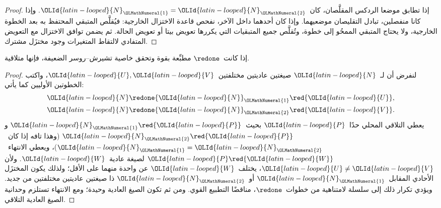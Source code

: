 \documentclass[../../../include/open-logic-section]{subfiles}
\begin{document}
\begin{proof}
  إذا تطابق موضعا الردكس المقلَّصان، كان~${\OLId{latin-looped}{N}}_{\OLMathNumeral{1}}={\OLId{latin-looped}{N}}_{\OLMathNumeral{2}}$. وإذا كانا منفصلين،
  تبادل التقليصان موضعيهما. وإذا كان أحدهما داخل الآخر، نفحص قاعدة الاختزال
  الخارجية: فيُقلَّص المتبقي المحتفظ به بعد الخطوة الخارجية، ولا يحتاج
  المتبقي الممحُو إلى خطوة، وتُقلَّص جميع المتبقيات التي يكررها تعويض بيتا أو
  تعويض الحالة. ثم يضمن توافق الاختزال مع التعويض المتفادي لالتقاط المتغيرات
  وجود مختزَل مشترك.
\end{proof}

\begin{lem}
إذا كانت~$\redone$ مطبِّعة بقوة وتحقق خاصية تشيرش--روسر الضعيفة، فإنها
متلاقية.
\end{lem}

\begin{proof}
  لنفرض أن لـ~${\OLId{latin-looped}{N}}$ صيغتين عاديتين مختلفتين~${\OLId{latin-looped}{U}},{\OLId{latin-looped}{V}}$، واكتب الخطوتين الأوليين
  كما يأتي:
  \begin{align*}
    {\OLId{latin-looped}{N}} &\redone {\OLId{latin-looped}{N}}_{\OLMathNumeral{1}}\red {\OLId{latin-looped}{U}},\\
    {\OLId{latin-looped}{N}} &\redone {\OLId{latin-looped}{N}}_{\OLMathNumeral{2}}\red {\OLId{latin-looped}{V}}.
  \end{align*}
  يعطي التلاقي المحلي حدًا~${\OLId{latin-looped}{P}}$ بحيث~${\OLId{latin-looped}{N}}_{\OLMathNumeral{1}}\red {\OLId{latin-looped}{P}}$ و${\OLId{latin-looped}{N}}_{\OLMathNumeral{2}}\red {\OLId{latin-looped}{P}}$ (وهذا تافه
  إذا كان~${\OLId{latin-looped}{N}}_{\OLMathNumeral{1}}={\OLId{latin-looped}{N}}_{\OLMathNumeral{2}}$)، ويعطي الانتهاء~${\OLId{latin-looped}{P}}\red {\OLId{latin-looped}{W}}$ لصيغة عادية~${\OLId{latin-looped}{W}}$. ولأن
  ${\OLId{latin-looped}{U}}\ne {\OLId{latin-looped}{V}}$، يختلف~${\OLId{latin-looped}{W}}$ عن واحدة منهما على الأقل؛ ولذلك يكون المختزَل الأحادي
  المقابل~${\OLId{latin-looped}{N}}_{\OLMathNumeral{1}}$ أو~${\OLId{latin-looped}{N}}_{\OLMathNumeral{2}}$ ذا صيغتين عاديتين مختلفتين من جديد. ويؤدي تكرار
  ذلك إلى سلسلة لامتناهية من خطوات~$\redone$، مناقضًا التطبيع القوي. ومن ثم
  تكون الصيغ العادية وحيدة؛ ومع الانتهاء تستلزم وحدانية الصيغ العادية
  التلاقي.
\end{proof}
\end{document}
